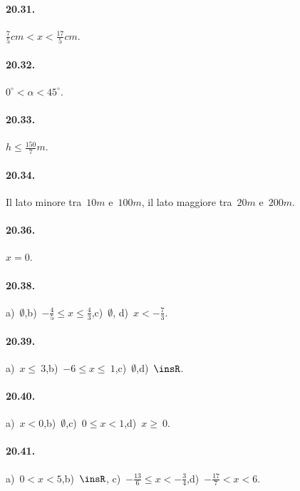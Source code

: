 \begin{multicols}{2}
\paragraph{20.31.} $\frac{7}{5}\unit{cm}<x<\frac{17}{5}\unit{cm}$.

\paragraph{20.32.} $0^{\circ}<\alpha<45^{\circ}$.

\paragraph{20.33.} $h\le \frac{150}{7}m$.
\end{multicols}

\paragraph{20.34.} Il lato minore tra~$10\unit{m}$ e~$100\unit{m}$, il lato maggiore tra~$20\unit{m}$ e~$200\unit{m}$.

\paragraph{20.36.} $x = 0$.

\paragraph{20.38.} a)~$\emptyset $,\quad b)~$-{\frac{4}{5}}\le x\le\frac{4}{3}$,\quad c)~$\emptyset $,\quad
d)~$x<-{\frac{7}{3}}$.

\paragraph{20.39.} a)~$x\le~3$,\quad b)~$-6\le x\le~1$,\quad c)~$\emptyset $,\quad d)~$\insR$.

\paragraph{20.40.} a)~$x<0$,\quad b)~$\emptyset $,\quad c)~$0\le x<1$,\quad d)~$x\ge~0$.

\paragraph{20.41.} a)~$0<x<5$,\quad b)~$\insR$,\quad
\quad c)~$-{\frac{13}{6}}\le x<-{\frac{3}{4}}$,\quad d)~$-{\frac{17}{7}}<x<6$.

